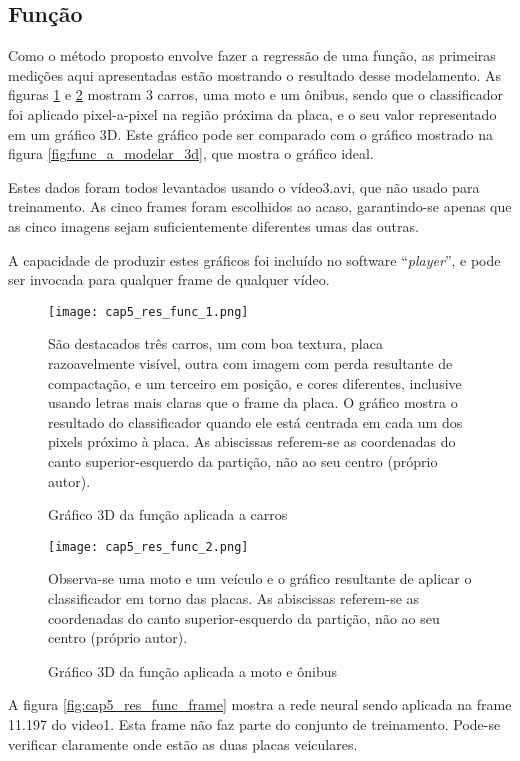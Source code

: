 \subsection{Função}

Como o método proposto envolve fazer a regressão de uma função, as primeiras
medições aqui apresentadas estão mostrando o resultado desse modelamento. As
figuras \ref{fig:cap5_res_func_1} e \ref{fig:cap5_res_func_2} mostram 3 carros,
uma moto e um ônibus, sendo que o classificador foi aplicado pixel-a-pixel na
região próxima da placa, e o seu valor representado em um gráfico 3D. Este
gráfico pode ser comparado com o gráfico mostrado na figura
\ref{fig:func_a_modelar_3d}, que mostra o gráfico ideal.

Estes dados foram todos levantados usando o vídeo3.avi, que não usado para
treinamento. As cinco frames foram escolhidos ao acaso, garantindo-se apenas
que as cinco imagens sejam suficientemente diferentes umas das outras.

A capacidade de produzir estes gráficos foi incluído no software
``\emph{player}'', e pode ser invocada para qualquer frame de qualquer vídeo.

\begin{figure}[!htb]
	\centering
	\texttt{[image: cap5\_res\_func\_1.png]}
	\caption{Gráfico 3D da função aplicada a carros}
	\label{fig:cap5_res_func_1}
	São destacados três carros, um com boa textura, placa razoavelmente
	visível, outra com imagem com perda resultante de compactação, e um
	terceiro em posição, e cores diferentes, inclusive usando letras mais
	claras que o frame da placa. O gráfico mostra o resultado do classificador
	quando ele está centrada em cada um dos pixels próximo à placa.
	As abiscissas referem-se as coordenadas do canto superior-esquerdo da
	partição, não ao seu centro (próprio autor).
\end{figure}

\begin{figure}[!htb]
	\centering
	\texttt{[image: cap5\_res\_func\_2.png]}
	\caption{Gráfico 3D da função aplicada a moto e ônibus}
	\label{fig:cap5_res_func_2}
	Observa-se uma moto e um veículo e o gráfico resultante de aplicar o
	classificador em torno das placas. As abiscissas referem-se as coordenadas
	do canto superior-esquerdo da partição, não ao seu centro (próprio autor).
\end{figure}

A figura \ref{fig:cap5_res_func_frame} mostra a rede neural sendo aplicada
na frame 11.197 do video1. Esta frame não faz parte do conjunto de treinamento.
Pode-se verificar claramente onde estão as duas placas veiculares.

